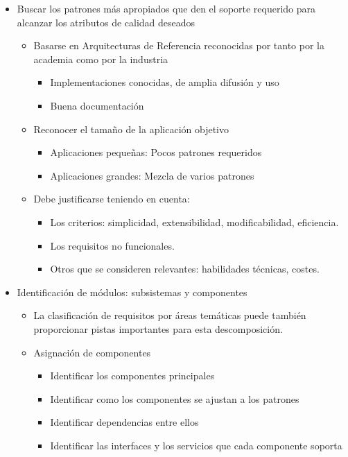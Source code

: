 \documentclass[12pt, twoside, openright]{report} %
\begin{document}
\begin{itemize}
	\item Buscar los patrones más apropiados que den el soporte requerido
	      para alcanzar los atributos de calidad deseados
	      \begin{itemize}
		      \item Basarse en Arquitecturas de Referencia reconocidas por tanto por
		            la academia como por la industria
		            \begin{itemize}
			            \item Implementaciones conocidas, de amplia difusión y uso
			            \item Buena documentación
		            \end{itemize}
		      \item Reconocer el tamaño de la aplicación objetivo
		            \begin{itemize}
			            \item Aplicaciones pequeñas: Pocos patrones requeridos
			            \item Aplicaciones grandes: Mezcla de varios patrones
		            \end{itemize}
		            \pagebreak
		      \item Debe justificarse teniendo en cuenta:
		            \begin{itemize}
			            \item Los criterios: simplicidad, extensibilidad, modificabilidad,
			                  eficiencia.
			            \item Los requisitos no funcionales.
			            \item Otros que se consideren relevantes: habilidades técnicas,
			                  costes.
		            \end{itemize}
	      \end{itemize}
	\item Identificación de módulos: subsistemas y componentes
	      \begin{itemize}
		      \item La clasificación de requisitos por áreas temáticas puede también
		            proporcionar pistas importantes para esta descomposición.
		      \item Asignación de componentes
		            \begin{itemize}
			            \item Identificar los componentes principales
			            \item Identificar como los componentes se ajustan a los patrones
			            \item Identificar dependencias entre ellos
			            \item Identificar las interfaces y los servicios que cada componente
			                  soporta
		            \end{itemize}
	      \end{itemize}
\end{itemize}
\end{document}
